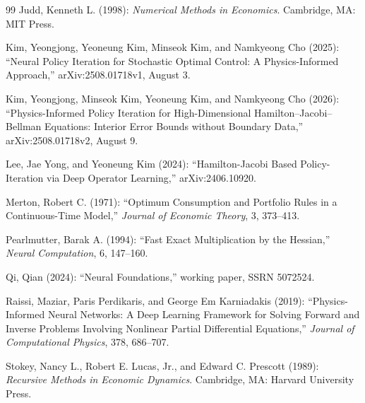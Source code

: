 \begin{thebibliography}{99}
Judd, Kenneth L. (1998): \emph{Numerical Methods in Economics}. Cambridge, MA: MIT Press.

Kim, Yeongjong, Yeoneung Kim, Minseok Kim, and Namkyeong Cho (2025): ``Neural Policy Iteration for Stochastic Optimal Control: A Physics-Informed Approach,'' arXiv:2508.01718v1, August 3.

Kim, Yeongjong, Minseok Kim, Yeoneung Kim, and Namkyeong Cho (2026): ``Physics-Informed Policy Iteration for High-Dimensional Hamilton--Jacobi--Bellman Equations: Interior Error Bounds without Boundary Data,'' arXiv:2508.01718v2, August 9.

Lee, Jae Yong, and Yeoneung Kim (2024): ``Hamilton-Jacobi Based Policy-Iteration via Deep Operator Learning,'' arXiv:2406.10920.

Merton, Robert C. (1971): ``Optimum Consumption and Portfolio Rules in a Continuous-Time Model,'' \emph{Journal of Economic Theory}, 3, 373--413.

Pearlmutter, Barak A. (1994): ``Fast Exact Multiplication by the Hessian,'' \emph{Neural Computation}, 6, 147--160.

Qi, Qian (2024): ``Neural Foundations,'' working paper, SSRN 5072524.

Raissi, Maziar, Paris Perdikaris, and George Em Karniadakis (2019): ``Physics-Informed Neural Networks: A Deep Learning Framework for Solving Forward and Inverse Problems Involving Nonlinear Partial Differential Equations,'' \emph{Journal of Computational Physics}, 378, 686--707.

Stokey, Nancy L., Robert E. Lucas, Jr., and Edward C. Prescott (1989): \emph{Recursive Methods in Economic Dynamics}. Cambridge, MA: Harvard University Press.

\end{thebibliography}
